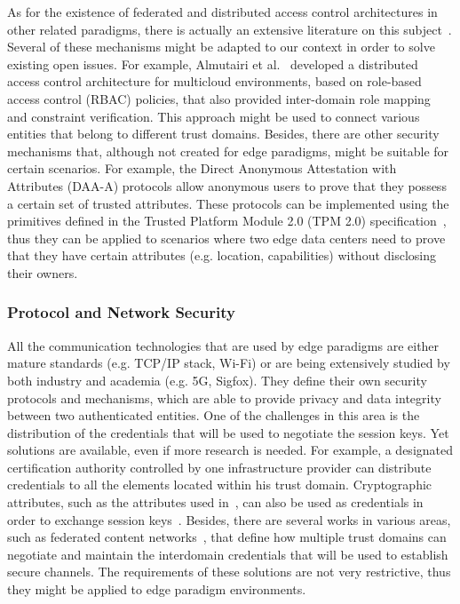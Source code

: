 \documentclass[twocolumn,preprint,3p]{elsarticle}
\begin{document}
As for the existence of federated and distributed access control architectures in other related paradigms, there is actually an extensive literature on this subject~\cite{Li15::Authe,Elsayed15}. Several of these mechanisms might be adapted to our context in order to solve existing open issues. For example, Almutairi et al.~\cite{Almutairi12} developed a distributed access control architecture for multicloud environments, based on role-based access control (RBAC) policies, that also provided inter-domain role mapping and constraint verification. This approach might be used to connect various entities that belong to different trust domains. Besides, there are other security mechanisms that, although not created for edge paradigms, might be suitable for certain scenarios. For example, the Direct Anonymous Attestation with Attributes (DAA-A) protocols allow anonymous users to prove that they possess a certain set of trusted attributes. These protocols can be implemented using the primitives defined in the Trusted Platform Module 2.0 (TPM 2.0) specification~\cite{Liqun15}, thus they can be applied to scenarios where two edge data centers need to prove that they have certain attributes (e.g. location, capabilities) without disclosing their owners.

\subsubsection{Protocol and Network Security}

All the communication technologies that are used by edge paradigms are either mature standards (e.g. TCP/IP stack, Wi-Fi) or are being extensively studied by both industry and academia (e.g. 5G, Sigfox). They define their own security protocols and mechanisms, which are able to provide privacy and data integrity between two authenticated entities. One of the challenges in this area is the distribution of the credentials that will be used to negotiate the session keys. Yet solutions are available, even if more research is needed. For example, a designated certification authority controlled by one infrastructure provider can distribute credentials to all the elements located within his trust domain. Cryptographic attributes, such as the attributes used in~\cite{HuangX14}, can also be used as credentials in order to exchange session keys~\cite{Gorantla2010}. Besides, there are several works in various areas, such as federated content networks~\cite{Pimentel201547}, that define how multiple trust domains can negotiate and maintain the interdomain credentials that will be used to establish secure channels. The requirements of these solutions are not very restrictive, thus they might be applied to edge paradigm environments.
\end{document}
